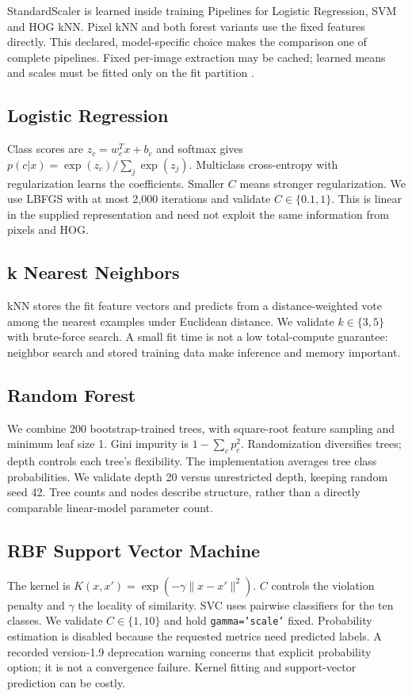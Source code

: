 \documentclass[conference]{IEEEtran}
\begin{document}
StandardScaler is learned inside training Pipelines for Logistic Regression,
SVM and HOG kNN. Pixel kNN and both forest variants use the fixed features
directly. This declared, model-specific choice makes the comparison one of
complete pipelines. Fixed per-image extraction may be cached; learned means
and scales must be fitted only on the fit partition \cite{sklearnpitfalls}.

\subsection{Logistic Regression}
Class scores are $z_c=w_c^Tx+b_c$ and softmax gives
$p(c|x)=\exp(z_c)/\sum_j\exp(z_j)$. Multiclass cross-entropy with regularization
learns the coefficients. Smaller $C$ means stronger regularization. We use
LBFGS with at most 2,000 iterations and validate $C\in\{0.1,1\}$. This is linear
in the supplied representation and need not exploit the same information from
pixels and HOG.

\subsection{k Nearest Neighbors}
kNN stores the fit feature vectors and predicts from a distance-weighted vote
among the nearest examples under Euclidean distance. We validate $k\in\{3,5\}$
with brute-force search. A small fit time is not a low total-compute guarantee:
neighbor search and stored training data make inference and memory important.

\subsection{Random Forest}
We combine 200 bootstrap-trained trees, with square-root feature sampling and
minimum leaf size 1. Gini impurity is $1-\sum_c p_c^2$. Randomization diversifies
trees; depth controls each tree's flexibility. The implementation averages
tree class probabilities. We validate depth 20 versus unrestricted depth,
keeping random seed 42. Tree counts and nodes describe structure, rather than
a directly comparable linear-model parameter count.

\subsection{RBF Support Vector Machine}
The kernel is $K(x,x')=\exp(-\gamma\lVert x-x'\rVert^2)$. $C$ controls the
violation penalty and $\gamma$ the locality of similarity. SVC uses pairwise
classifiers for the ten classes. We validate $C\in\{1,10\}$ and hold
\texttt{gamma='scale'} fixed. Probability estimation is disabled because the
requested metrics need predicted labels. A recorded version-1.9 deprecation
warning concerns that explicit probability option; it is not a convergence
failure. Kernel fitting and support-vector prediction can be costly.
\end{document}
